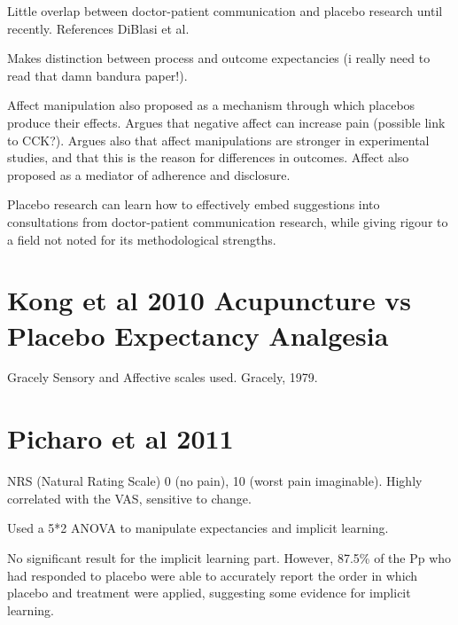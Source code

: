 \documentclass{article}
\begin{document}
Little overlap between doctor-patient communication and placebo research until recently. References DiBlasi et al. 

Makes distinction between process and outcome expectancies (i really need to read that damn bandura paper!).

Affect manipulation also proposed as a mechanism through which placebos produce their effects. Argues that negative affect can increase pain (possible link to CCK?). Argues also that affect manipulations are stronger in experimental studies, and that this is the reason for differences in outcomes. Affect also proposed as a mediator of adherence and disclosure. 

Placebo research can learn how to effectively embed suggestions into consultations from doctor-patient communication research, while giving rigour to a field not noted for its methodological strengths. 

\section{Kong  et al 2010 Acupuncture vs Placebo Expectancy Analgesia}
\label{sec:kong-et-al}

Gracely Sensory and Affective scales used. Gracely, 1979. 


\section{Picharo et al 2011}
\label{sec:picharo-et-al}

NRS (Natural Rating Scale) 0 (no pain), 10 (worst pain imaginable). Highly correlated with the VAS, sensitive to change. 

Used a 5*2 ANOVA to manipulate expectancies and implicit learning. 

No significant result for the implicit learning part. However, 87.5\% of the Pp who had responded to placebo were able to accurately report the order in which placebo and treatment were applied, suggesting some evidence for implicit learning. 
\end{document}
